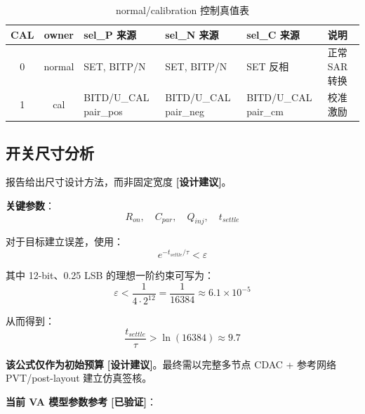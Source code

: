\documentclass[UTF8,a4paper,11pt]{ctexart}
\newcommand{\verified}{\textcolor{verifiedgreen}{\textbf{[已验证]}}}
\newcommand{\suggested}{\textcolor{suggestblue}{\textbf{[设计建议]}}}
\begin{document}
\begin{table}[H]
\centering
\caption{normal/calibration 控制真值表}
\label{tab:mode-control}
\begin{tabular}{ccllll}
\toprule
CAL & owner & sel\_P 来源 & sel\_N 来源 & sel\_C 来源 & 说明 \\
\midrule
0 & normal & SET, BITP/N & SET, BITP/N & SET 反相 & 正常 SAR 转换 \\
1 & cal    & BITD/U\_CAL pair\_pos & BITD/U\_CAL pair\_neg & BITD/U\_CAL pair\_cm & 校准激励 \\
\bottomrule
\end{tabular}
\end{table}

\subsection{开关尺寸分析}

报告给出尺寸设计方法，而非固定宽度 \suggested。

\textbf{关键参数}：
\begin{equation}
R_{on}, \quad C_{par}, \quad Q_{inj}, \quad t_{settle}
\label{eq:switch-params}
\end{equation}

对于目标建立误差，使用：
\begin{equation}
e^{-t_{settle}/\tau} < \varepsilon
\label{eq:settle-error}
\end{equation}

其中 12-bit、0.25 LSB 的理想一阶约束可写为：
\begin{equation}
\varepsilon < \frac{1}{4 \cdot 2^{12}} = \frac{1}{16384} \approx 6.1 \times 10^{-5}
\label{eq:epsilon-bound}
\end{equation}

从而得到：
\begin{equation}
\frac{t_{settle}}{\tau} > \ln(16384) \approx 9.7
\label{eq:settle-ratio}
\end{equation}

\textbf{该公式仅作为初始预算} \suggested。最终需以完整多节点 CDAC + 参考网络 PVT/post-layout 建立仿真签核。

\textbf{当前 VA 模型参数参考} \verified：
\end{document}
